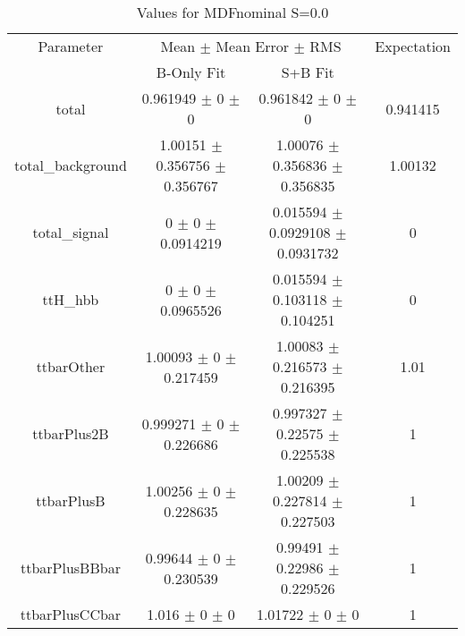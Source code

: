 \begin{table}
\centering
\caption{Values for MDFnominal S=0.0}
\begin{tabular}{cccc}
\toprule
Parameter & \multicolumn{2}{c}{Mean $\pm$ Mean Error $\pm$ RMS} & Expectation\\
 & B-Only Fit & S+B Fit & \\
\midrule
total & \num{0.961949} $\pm$ \num{0} $\pm$ \num{0} & \num{0.961842} $\pm$ \num{0} $\pm$ \num{0} & \num{0.941415}\\
total\_background & \num{1.00151} $\pm$ \num{0.356756} $\pm$ \num{0.356767} & \num{1.00076} $\pm$ \num{0.356836} $\pm$ \num{0.356835} & \num{1.00132}\\
total\_signal & \num{0} $\pm$ \num{0} $\pm$ \num{0.0914219} & \num{0.015594} $\pm$ \num{0.0929108} $\pm$ \num{0.0931732} & \num{0}\\
ttH\_hbb & \num{0} $\pm$ \num{0} $\pm$ \num{0.0965526} & \num{0.015594} $\pm$ \num{0.103118} $\pm$ \num{0.104251} & \num{0}\\
ttbarOther & \num{1.00093} $\pm$ \num{0} $\pm$ \num{0.217459} & \num{1.00083} $\pm$ \num{0.216573} $\pm$ \num{0.216395} & \num{1.01}\\
ttbarPlus2B & \num{0.999271} $\pm$ \num{0} $\pm$ \num{0.226686} & \num{0.997327} $\pm$ \num{0.22575} $\pm$ \num{0.225538} & \num{1}\\
ttbarPlusB & \num{1.00256} $\pm$ \num{0} $\pm$ \num{0.228635} & \num{1.00209} $\pm$ \num{0.227814} $\pm$ \num{0.227503} & \num{1}\\
ttbarPlusBBbar & \num{0.99644} $\pm$ \num{0} $\pm$ \num{0.230539} & \num{0.99491} $\pm$ \num{0.22986} $\pm$ \num{0.229526} & \num{1}\\
ttbarPlusCCbar & \num{1.016} $\pm$ \num{0} $\pm$ \num{0} & \num{1.01722} $\pm$ \num{0} $\pm$ \num{0} & \num{1}\\
\bottomrule
\end{tabular}
\end{table}